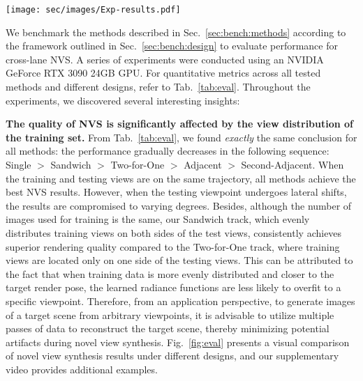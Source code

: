 \begin{figure*}[t]
\texttt{[image: sec/images/Exp-results.pdf]}
\caption{Comparisons for NVS quality between different methods and designs, see our supplementary video for results on more sequences.}
\label{fig:eval}
\end{figure*}

We benchmark the methods described in Sec.~\ref{sec:bench:methods} according to the framework outlined in Sec.~\ref{sec:bench:design} to evaluate performance for cross-lane NVS. A series of experiments were conducted using an NVIDIA GeForce RTX 3090 24GB GPU. For quantitative metrics across all tested methods and different designs, refer to Tab.~\ref{tab:eval}. Throughout the experiments, we discovered several interesting insights:
\vspace{4pt}

\noindent \textbf{The quality of NVS is significantly affected by the view distribution of the training set.} 
From Tab.~\ref{tab:eval}, we found {\emph{exactly}} the same conclusion for all methods: the performance gradually decreases in the following sequence: Single $>$ Sandwich $>$ Two-for-One $>$ Adjacent $>$ Second-Adjacent. When the training and testing views are on the same trajectory, all methods achieve the best NVS results. However, when the testing viewpoint undergoes lateral shifts, the results are compromised to varying degrees. 
{Besides, although the number of images used for training is the same, our Sandwich {track}, which evenly distributes training views on both sides of the test views, consistently achieves superior rendering quality compared to the Two-for-One {track}, where training views are located only on one side of the testing views.}
This can be attributed to the fact that when training data is more evenly distributed and closer to the target render pose, the learned radiance functions are less likely to overfit to a specific viewpoint. 
Therefore, from an application perspective, to generate images of a target scene from arbitrary viewpoints, it is advisable to utilize multiple passes of data to reconstruct the target scene, thereby minimizing potential artifacts during novel view synthesis.
{Fig.~\ref{fig:eval} presents a visual comparison of novel view synthesis results under different designs, and our supplementary video provides additional examples. }


